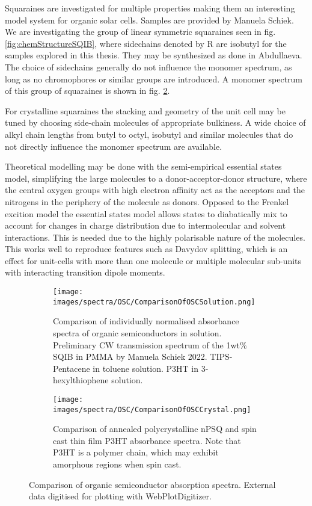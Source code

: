 \documentclass[twoside,openright,listof=numbered]{scrreprt}
\begin{document}
Squaraines are investigated for multiple properties making them an interesting model system for organic solar cells. Samples are provided by Manuela Schiek.  We are investigating the group of linear symmetric squaraines seen in fig. \ref{fig:chemStructureSQIB}, where sidechains denoted by R are isobutyl for the samples explored in this thesis. They may be synthesized as done in Abdullaeva\cite{Abdullaeva2016}. The choice of sidechains generally do not influence the monomer spectrum, as long as no chromophores or similar groups are introduced. A monomer spectrum of this group of squaraines is shown in fig. \ref{fig:compOSC}.

For crystalline squaraines the stacking and geometry of the unit cell may be tuned by choosing side-chain molecules of appropriate bulkiness. A wide choice of alkyl chain lengths from butyl to octyl, isobutyl and similar molecules that do not directly influence the monomer spectrum are available. \cite{Hestand2015, Brueck2014, Balzer2022} 

Theoretical modelling may be done with the semi-empirical essential states model, simplifying the large molecules to a donor-acceptor-donor structure, where the central oxygen groups with high electron affinity act as the acceptors and the nitrogens in the periphery of the molecule as donors. Opposed to the Frenkel excition model the essential states model allows states to diabatically mix to account for changes in charge distribution due to intermolecular and solvent interactions. This is needed due to the highly polarisable nature of the molecules. This works well to reproduce features such as Davydov splitting, which is an effect for unit-cells with more than one molecule or multiple molecular sub-units with interacting transition dipole moments.\cite{Zhong2019, Hestand2015} 



\begin{figure}[hbtp]
\centering
\begin{subfigure}[b]{\textwidth}
\texttt{[image: images/spectra/OSC/ComparisonOfOSCSolution.png]}
\caption{Comparison of individually normalised absorbance spectra of organic semiconductors in solution. Preliminary CW transmission spectrum of the 1wt\% SQIB in PMMA by Manuela Schiek 2022.\cite{Schiek2022} TIPS-Pentacene in toluene solution.\cite{Schaberle2020} P3HT in 3-hexylthiophene solution\cite{Rahimi2014}.}
\end{subfigure}
\begin{subfigure}[b]{\textwidth}
\texttt{[image: images/spectra/OSC/ComparisonOfOSCCrystal.png]}
\caption{Comparison of annealed polycrystalline nPSQ\cite{Balzer2022} and spin cast thin film P3HT absorbance spectra. Note that P3HT is a polymer chain, which may exhibit amorphous regions when spin cast.\cite{Rahimi2014}\label{fig:crystOSC}}
\end{subfigure}
\caption[Comparison of organic semiconductor absorption spectra.]{Comparison of organic semiconductor absorption spectra. External data digitised for plotting with WebPlotDigitizer.\cite{Rohatgi2022}\label{fig:compOSC}}
\end{figure}
\end{document}
